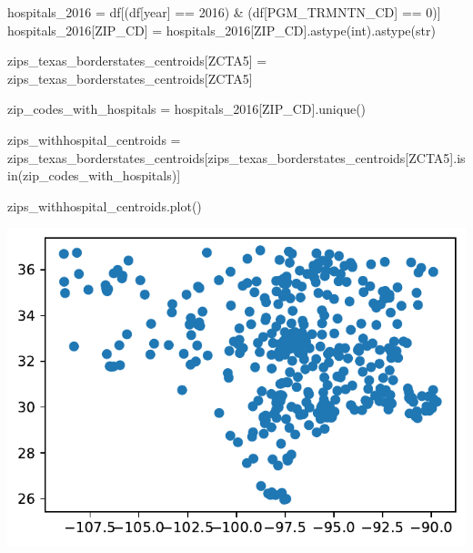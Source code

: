 \documentclass[
  letterpaper,
  DIV=11,
  numbers=noendperiod]{scrartcl}
\newenvironment{Shaded}{\begin{snugshade}}{\end{snugshade}}
\newcommand{\BuiltInTok}[1]{\textcolor[rgb]{0.00,0.23,0.31}{#1}}
\newcommand{\DecValTok}[1]{\textcolor[rgb]{0.68,0.00,0.00}{#1}}
\newcommand{\NormalTok}[1]{\textcolor[rgb]{0.00,0.23,0.31}{#1}}
\newcommand{\OperatorTok}[1]{\textcolor[rgb]{0.37,0.37,0.37}{#1}}
\newcommand{\StringTok}[1]{\textcolor[rgb]{0.13,0.47,0.30}{#1}}
\begin{document}
\begin{Shaded}
\begin{Highlighting}[]
\NormalTok{hospitals\_2016 }\OperatorTok{=}\NormalTok{ df[(df[}\StringTok{\textquotesingle{}year\textquotesingle{}}\NormalTok{] }\OperatorTok{==} \DecValTok{2016}\NormalTok{) }\OperatorTok{\&}\NormalTok{ (df[}\StringTok{\textquotesingle{}PGM\_TRMNTN\_CD\textquotesingle{}}\NormalTok{] }\OperatorTok{==} \DecValTok{0}\NormalTok{)]}
\NormalTok{hospitals\_2016[}\StringTok{\textquotesingle{}ZIP\_CD\textquotesingle{}}\NormalTok{] }\OperatorTok{=}\NormalTok{ hospitals\_2016[}\StringTok{\textquotesingle{}ZIP\_CD\textquotesingle{}}\NormalTok{].astype(}\BuiltInTok{int}\NormalTok{).astype(}\BuiltInTok{str}\NormalTok{)}

\NormalTok{zips\_texas\_borderstates\_centroids[}\StringTok{\textquotesingle{}ZCTA5\textquotesingle{}}\NormalTok{] }\OperatorTok{=}\NormalTok{ zips\_texas\_borderstates\_centroids[}\StringTok{\textquotesingle{}ZCTA5\textquotesingle{}}\NormalTok{]}

\NormalTok{zip\_codes\_with\_hospitals }\OperatorTok{=}\NormalTok{ hospitals\_2016[}\StringTok{\textquotesingle{}ZIP\_CD\textquotesingle{}}\NormalTok{].unique()}

\NormalTok{zips\_withhospital\_centroids }\OperatorTok{=}\NormalTok{ zips\_texas\_borderstates\_centroids[zips\_texas\_borderstates\_centroids[}\StringTok{\textquotesingle{}ZCTA5\textquotesingle{}}\NormalTok{].isin(zip\_codes\_with\_hospitals)]}

\NormalTok{zips\_withhospital\_centroids.plot()}
\end{Highlighting}
\end{Shaded}

\includegraphics{ps4_files/figure-pdf/cell-23-output-1.pdf}
\end{document}
